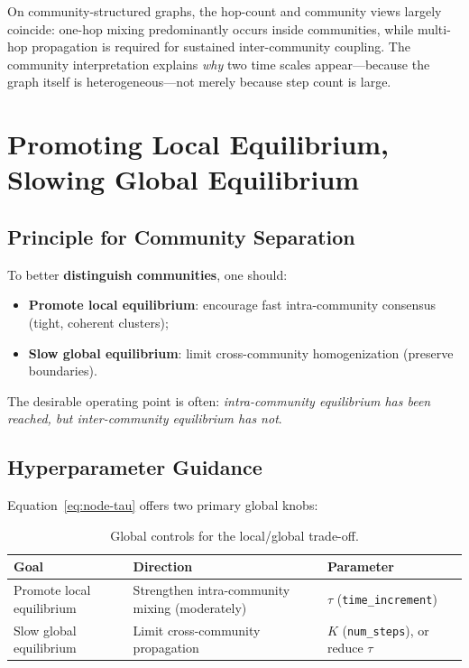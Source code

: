 \documentclass[11pt,a4paper]{report}
\begin{document}
On community-structured graphs, the hop-count and community views largely coincide: one-hop mixing predominantly occurs inside communities, while multi-hop propagation is required for sustained inter-community coupling. The community interpretation explains \emph{why} two time scales appear---because the graph itself is heterogeneous---not merely because step count is large.

\chapter{Promoting Local Equilibrium, Slowing Global Equilibrium}

\section{Principle for Community Separation}

To better \textbf{distinguish communities}, one should:
\begin{itemize}[noitemsep]
    \item \textbf{Promote local equilibrium}: encourage fast intra-community consensus (tight, coherent clusters);
    \item \textbf{Slow global equilibrium}: limit cross-community homogenization (preserve boundaries).
\end{itemize}

The desirable operating point is often: \emph{intra-community equilibrium has been reached, but inter-community equilibrium has not}.

\section{Hyperparameter Guidance}

Equation~\eqref{eq:node-tau} offers two primary global knobs:

\begin{table}[h]
\centering
\caption{Global controls for the local/global trade-off.}
\begin{tabular}{@{}lll@{}}
\toprule
\textbf{Goal} & \textbf{Direction} & \textbf{Parameter} \\
\midrule
Promote local equilibrium   & Strengthen intra-community mixing (moderately) & $\tau$ (\texttt{time\_increment}) \\
Slow global equilibrium     & Limit cross-community propagation            & $K$ (\texttt{num\_steps}), or reduce $\tau$ \\
\bottomrule
\end{tabular}
\end{table}
\end{document}
